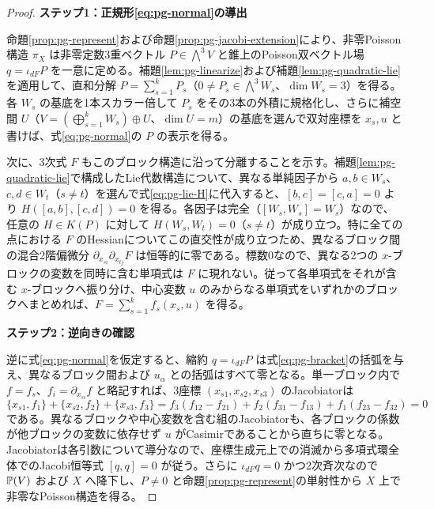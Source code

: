 \begin{proof}
\par\medskip\noindent\textbf{ステップ1：正規形\eqref{eq:pg-normal}の導出}\par\nobreak\smallskip
命題\ref{prop:pg-represent}および命題\ref{prop:pg-jacobi-extension}により、非零Poisson構造 $\pi_X$ は非零定数3重ベクトル $P\in\bigwedge^3V$ と錐上のPoisson双ベクトル場 $q=\iota_{dF}P$ を一意に定める。補題\ref{lem:pg-linearize}および補題\ref{lem:pg-quadratic-lie}を適用して、直和分解 $P=\sum_{s=1}^k P_s$（$0\ne P_s\in\bigwedge^3W_s$、$\dim W_s=3$）を得る。各 $W_s$ の基底を1本スカラー倍して $P_s$ をその3本の外積に規格化し、さらに補空間 $U$（$V=(\bigoplus_{s=1}^k W_s)\oplus U$、$\dim U=m$）の基底を選んで双対座標を $x_s,u$ と書けば、式\eqref{eq:pg-normal}の $P$ の表示を得る。

次に、3次式 $F$ もこのブロック構造に沿って分離することを示す。補題\ref{lem:pg-quadratic-lie}で構成したLie代数構造について、異なる単純因子から $a,b\in W_s$、$c,d\in W_t$（$s\ne t$）を選んで式\eqref{eq:pg-lie-H}に代入すると、$[b,c]=[c,a]=0$ より $H([a,b],[c,d])=0$ を得る。各因子は完全（$[W_s,W_s]=W_s$）なので、任意の $H\in K(P)$ に対して $H(W_s,W_t)=0$（$s\ne t$）が成り立つ。特に全ての点における $F$ のHessianについてこの直交性が成り立つため、異なるブロック間の混合2階偏微分 $\partial_{x_{si}}\partial_{x_{tj}}F$ は恒等的に零である。標数0なので、異なる2つの $x$-ブロックの変数を同時に含む単項式は $F$ に現れない。従って各単項式をそれが含む $x$-ブロックへ振り分け、中心変数 $u$ のみからなる単項式をいずれかのブロックへまとめれば、$F=\sum_{s=1}^k f_s(x_s,u)$ を得る。

\par\medskip\noindent\textbf{ステップ2：逆向きの確認}\par\nobreak\smallskip
逆に式\eqref{eq:pg-normal}を仮定すると、縮約 $q=\iota_{dF}P$ は式\eqref{eq:pg-bracket}の括弧を与え、異なるブロック間および $u_\alpha$ との括弧はすべて零となる。単一ブロック内で $f=f_s$、$f_i=\partial_{x_{si}}f$ と略記すれば、3座標 $(x_{s1},x_{s2},x_{s3})$ のJacobiatorは
\begin{equation}\label{eq:pg-block-jacobi-calculation}
\{x_{s1},f_1\}+\{x_{s2},f_2\}+\{x_{s3},f_3\}
=f_3(f_{12}-f_{21})+f_2(f_{31}-f_{13})
 +f_1(f_{23}-f_{32})=0
\end{equation}
である。異なるブロックや中心変数を含む組のJacobiatorも、各ブロックの係数が他ブロックの変数に依存せず $u$ がCasimirであることから直ちに零となる。Jacobiatorは各引数について導分なので、座標生成元上での消滅から多項式環全体でのJacobi恒等式 $[q,q]=0$ が従う。さらに $\iota_{dF}q=0$ かつ2次斉次なので $\mathbb P(V)$ および $X$ へ降下し、$P\ne0$ と命題\ref{prop:pg-represent}の単射性から $X$ 上で非零なPoisson構造を得る。


\end{proof}
